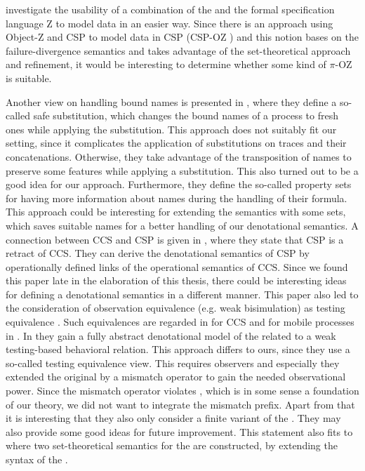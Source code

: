 investigate the usability of a combination of the \picalc{} and the formal specification language Z \cite{zNotation, spivey} to model data in an easier way. Since there is an approach using Object-Z \cite{Object-Z,OZSmith} and CSP to model data in CSP (CSP-OZ \cite{fischerCsp}) and this notion bases on the failure-divergence semantics and takes advantage of the set-theoretical approach and refinement, it would be interesting to determine whether some kind of $\pi$-OZ is suitable.

Another view on handling bound names is presented in \cite{caires}, where they define a so-called safe substitution, which changes the bound names of a process to fresh ones while applying the substitution. This approach does not suitably fit our setting, since it complicates the application of substitutions on traces and their concatenations. Otherwise, they take advantage of the transposition of names to preserve some features while applying a substitution. This also turned out to be a good idea for our approach. Furthermore, they define the so-called property sets for having more information about names during the handling of their formula. This approach could be interesting for extending the semantics with some sets, which saves suitable names for a better handling of our denotational semantics. A connection between CCS and CSP is given in \cite{cspRetract1,cspRetract2}, where they state that CSP is a retract of CCS. They can derive the denotational semantics of CSP by operationally defined links of the operational semantics of CCS. Since we found this paper late in the elaboration of this thesis, there could be interesting ideas for defining a denotational semantics in a different manner. This paper also led to the consideration of observation equivalence (e.g. weak bisimulation) as testing equivalence \cite{testEquiv}. Such equivalences are regarded in \cite{testingCCS} for CCS and for mobile processes in \cite{testingCSP}. In \cite{testingCSP} they gain a fully abstract denotational model of the \picalc{} related to a weak testing-based behavioral relation. This approach differs to ours, since they use a so-called testing equivalence view. This requires observers and especially they extended the original \picalc{} by a mismatch operator to gain the needed observational power. Since the mismatch operator violates , which is in some sense a foundation of our theory, we did not want to integrate the mismatch prefix. Apart from that it is interesting that they also only consider a finite variant of the \picalc{}. They may also provide some good ideas for future improvement. This statement also fits to \cite{hennessy} where two set-theoretical semantics for the \picalc{} are constructed, by extending the syntax of the \picalc{}.